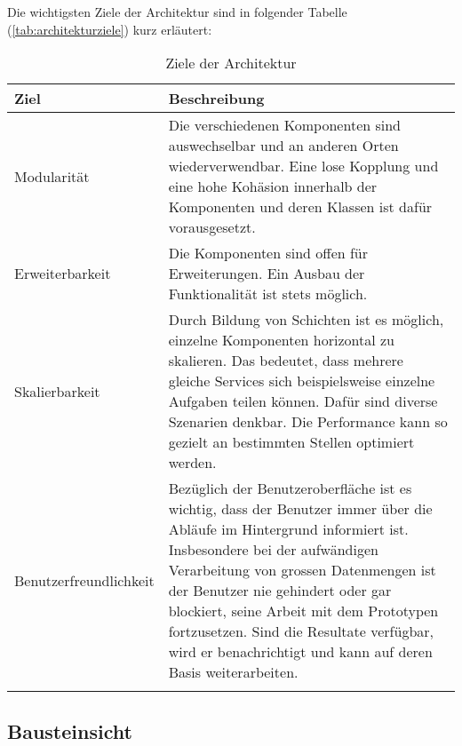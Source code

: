 Die wichtigsten Ziele der Architektur sind in folgender Tabelle (\autoref{tab:architekturziele}) kurz erläutert:

\begin{longtable}{|p{4.5cm}|p{8.5cm}|}

  \hline
    Ziel &  Beschreibung \\\hline
    Modularität & Die verschiedenen Komponenten sind auswechselbar und an anderen Orten wiederverwendbar. Eine lose Kopplung und eine hohe Kohäsion innerhalb der Komponenten und deren Klassen ist dafür vorausgesetzt.\\\hline
    Erweiterbarkeit & Die Komponenten sind offen für Erweiterungen. Ein Ausbau der Funktionalität ist stets möglich.\\\hline
    Skalierbarkeit & Durch Bildung von Schichten ist es möglich, einzelne Komponenten horizontal zu skalieren. Das bedeutet, dass mehrere gleiche Services sich beispielsweise einzelne Aufgaben teilen können. Dafür sind diverse Szenarien denkbar. Die Performance kann so gezielt an bestimmten Stellen optimiert werden.\\\hline
    Benutzerfreundlichkeit & Bezüglich der Benutzeroberfläche ist es wichtig, dass der Benutzer immer über die Abläufe im Hintergrund informiert ist. Insbesondere bei der aufwändigen Verarbeitung von grossen Datenmengen ist der Benutzer nie gehindert oder gar blockiert, seine Arbeit mit dem Prototypen fortzusetzen. Sind die Resultate verfügbar, wird er benachrichtigt und kann auf deren Basis weiterarbeiten.\\\hline
    \caption{Ziele der Architektur}
  \label{tab:architekturziele}
\end{longtable}



\subsection{Bausteinsicht}



